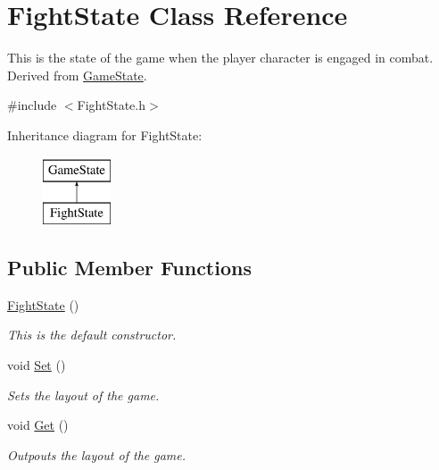 \hypertarget{classFightState}{\section{Fight\-State Class Reference}
\label{classFightState}
}


This is the state of the game when the player character is engaged in combat. Derived from \hyperlink{classGameState}{Game\-State}.  




{\ttfamily \#include $<$Fight\-State.\-h$>$}

Inheritance diagram for Fight\-State\-:\begin{figure}[H]
\begin{center}
\leavevmode
\includegraphics[height=2.000000cm]{classFightState}
\end{center}
\end{figure}
\subsection*{Public Member Functions}
\begin{DoxyCompactItemize}
\item 
\hypertarget{classFightState_afe4bbc2ba8a3aac74abca651bf23e91d}{\hyperlink{classFightState_afe4bbc2ba8a3aac74abca651bf23e91d}{Fight\-State} ()}\label{classFightState_afe4bbc2ba8a3aac74abca651bf23e91d}

\begin{DoxyCompactList}\small\item\em This is the default constructor. \end{DoxyCompactList}\item 
\hypertarget{classFightState_a853f6d2a9caf7343b8d75165e44bf5c1}{void \hyperlink{classFightState_a853f6d2a9caf7343b8d75165e44bf5c1}{Set} ()}\label{classFightState_a853f6d2a9caf7343b8d75165e44bf5c1}

\begin{DoxyCompactList}\small\item\em Sets the layout of the game. \end{DoxyCompactList}\item 
\hypertarget{classFightState_afeff88d0e0c0fa25049e2152190429ed}{void \hyperlink{classFightState_afeff88d0e0c0fa25049e2152190429ed}{Get} ()}\label{classFightState_afeff88d0e0c0fa25049e2152190429ed}

\begin{DoxyCompactList}\small\item\em Outpouts the layout of the game. \end{DoxyCompactList}\end{DoxyCompactItemize}

